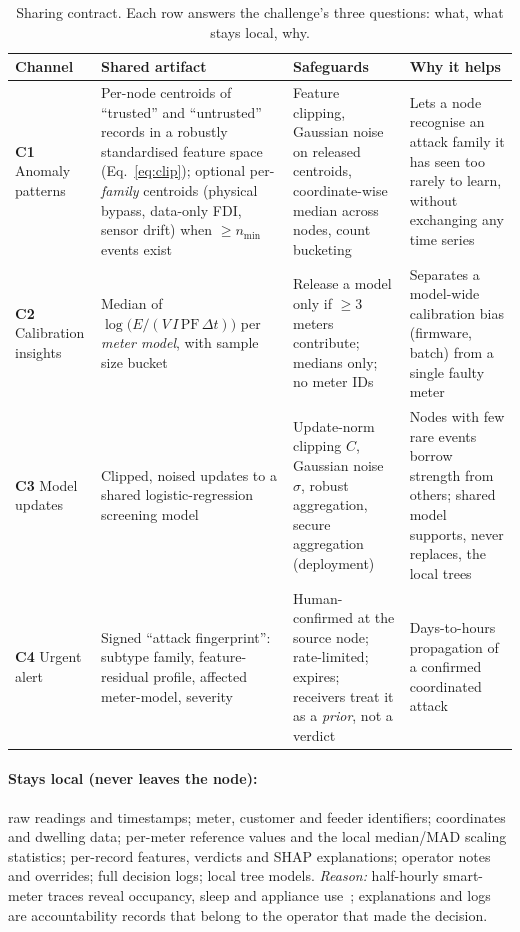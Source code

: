 \documentclass[11pt,a4paper]{article}
\newcommand{\hdr}{\rowcolor{emblue!15}}
\begin{document}
\begin{table}[H]
\centering\small
\caption{Sharing contract. Each row answers the challenge's three questions: what, what stays local, why.}
\label{tab:sharing}
\begin{tabularx}{\textwidth}{@{}p{2.1cm} Y Y Y@{}}
\toprule\hdr
Channel & Shared artifact & Safeguards & Why it helps \\
\midrule
\textbf{C1} Anomaly patterns & Per-node centroids of ``trusted'' and ``untrusted'' records in a robustly standardised feature space (Eq.~\ref{eq:clip}); optional per-\emph{family} centroids (physical bypass, data-only FDI, sensor drift) when $\ge n_{\min}$ events exist & Feature clipping, Gaussian noise on released centroids, coordinate-wise median across nodes, count bucketing & Lets a node recognise an attack family it has seen too rarely to learn, without exchanging any time series \\
\addlinespace
\textbf{C2} Calibration insights & Median of $\log\!\big(E/(V\,I\,\mathrm{PF}\,\Delta t)\big)$ per \emph{meter model}, with sample size bucket & Release a model only if $\ge 3$ meters contribute; medians only; no meter IDs & Separates a model-wide calibration bias (firmware, batch) from a single faulty meter \\
\addlinespace
\textbf{C3} Model updates & Clipped, noised updates to a shared logistic-regression screening model & Update-norm clipping $C$, Gaussian noise $\sigma$, robust aggregation, secure aggregation (deployment) & Nodes with few rare events borrow strength from others; shared model supports, never replaces, the local trees \\
\addlinespace
\textbf{C4} Urgent alert & Signed ``attack fingerprint'': subtype family, feature-residual profile, affected meter-model, severity & Human-confirmed at the source node; rate-limited; expires; receivers treat it as a \emph{prior}, not a verdict & Days-to-hours propagation of a confirmed coordinated attack \\
\bottomrule
\end{tabularx}
\end{table}

\paragraph{Stays local (never leaves the node):} raw readings and timestamps; meter, customer and feeder identifiers; coordinates and dwelling data; per-meter reference values and the local median/MAD scaling statistics; per-record features, verdicts and SHAP explanations; operator notes and overrides; full decision logs; local tree models. \emph{Reason:} half-hourly smart-meter traces reveal occupancy, sleep and appliance use~\cite{hart1992,molina2010}; explanations and logs are accountability records that belong to the operator that made the decision.
\end{document}
